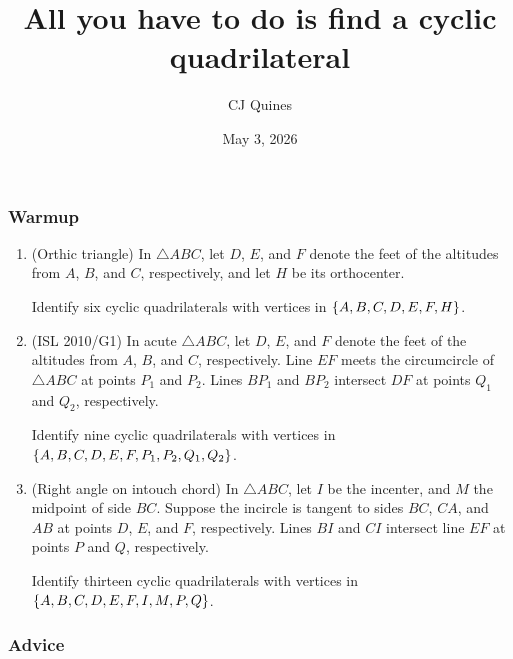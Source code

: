 \documentclass[11pt,paper=letter]{scrartcl}
\begin{document}
\title{All you have to do is find a cyclic quadrilateral}
\author{CJ Quines}
\date{May 3, 2026}

\maketitle

\subsubsection*{Warmup}

\begin{enumerate}

\item (Orthic triangle) In $\triangle ABC$, let $D$, $E$, and $F$ denote the feet of the altitudes from $A$, $B$, and $C$, respectively, and let $H$ be its orthocenter.

Identify six cyclic quadrilaterals with vertices in $\left\{ A, B, C, D, E, F, H \right\}$. %

\item (ISL 2010/G1) In acute $\triangle ABC$, let $D$, $E$, and $F$ denote the feet of the altitudes from $A$, $B$, and $C$, respectively. Line $EF$ meets the circumcircle of $\triangle ABC$ at points $P_1$ and $P_2$. Lines $BP_1$ and $BP_2$ intersect $DF$ at points $Q_1$ and $Q_2$, respectively.

Identify nine cyclic quadrilaterals with vertices in $\left\{ A, B, C, D, E, F, P_1, P_2, Q_1, Q_2 \right\}$. %

\item (Right angle on intouch chord) In $\triangle ABC$, let $I$ be the incenter, and $M$ the midpoint of side $BC$. Suppose the incircle is tangent to sides $BC$, $CA$, and $AB$ at points $D$, $E$, and $F$, respectively. Lines $BI$ and $CI$ intersect line $EF$ at points $P$ and $Q$, respectively.

Identify thirteen cyclic quadrilaterals with vertices in $\left\{ A, B, C, D, E, F, I, M, P, Q \right\}$. %

\end{enumerate}

\subsubsection*{Advice}
\end{document}
